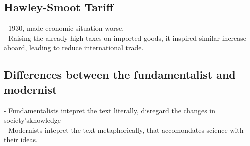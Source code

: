 \documentclass{article}
\begin{document}
\subsection{ Hawley-Smoot Tariff}
- 1930, made economic situation worse.\\
- Raising the already high taxes on imported goods, it inspired similar increase aboard, leading to reduce international trade.\\

\subsection {Differences between the fundamentalist and modernist}
- Fundamentalists intepret the text literally, disregard the changes in
society'sknowledge\\
 - Modernists intepret the text metaphorically, that accomondates science with
 their ideas. \\
\end{document}
